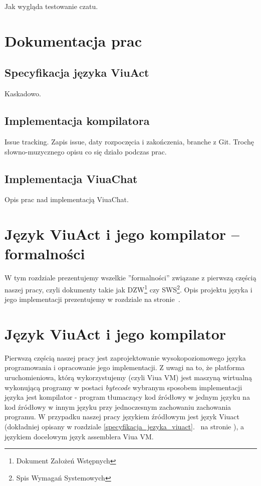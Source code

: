 \documentclass[11pt,oneside,a4paper,titlepage,onecolumn]{book}
\begin{document}
Jak wygląda testowanie czatu.

\chapter{Dokumentacja prac}

\section{Specyfikacja języka ViuAct}

Kaskadowo.

\section{Implementacja kompilatora}

Issue tracking. Zapis issue, daty rozpoczęcia i zakończenia, branche z Git. Trochę słowno-muzycznego opisu co
się działo podczas prac.

\section{Implementacja ViuaChat}

Opis prac nad implementacją ViuaChat.

\chapter{Język ViuAct i jego kompilator -- formalności}

W tym rozdziale prezentujemy wszelkie ''formalności'' związane z pierwszą częścią naszej pracy, czyli
dokumenty takie jak DZW\footnote{Dokument Założeń Wstępnych} czy SWS\footnote{Spis Wymagań Systemowych}.
Opis projektu języka i jego implementacji prezentujemy w rozdziale  na
stronie~\pageref{jezyk_viuact_i_jego_kompilator}.





\chapter{Język ViuAct i jego kompilator}
\label{jezyk_viuact_i_jego_kompilator}

Pierwszą częścią naszej pracy jest zaprojektowanie wysokopoziomowego języka programowania i opracowanie jego
implementacji. Z uwagi na to, że platforma uruchomieniowa, którą wykorzystujemy (czyli Viua VM) jest maszyną
wirtualną wykonującą programy w postaci \emph{bytecode} wybranym sposobem implementacji języka jest
kompilator - program tłumaczący kod źródłowy w jednym języku na kod źródłowy w innym języku przy jednoczesnym
zachowaniu zachowania programu. W przypadku naszej pracy językiem źródłowym jest język Viuact (dokładniej
opisany w rozdziale \ref{specyfikacja_jezyka_viuact}.~ na stronie
\pageref{specyfikacja_jezyka_viuact}), a językiem docelowym język assemblera Viua VM.
\end{document}
